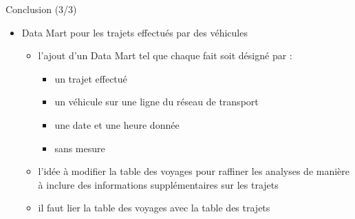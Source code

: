 \documentclass[usenames,dvipsnames]{beamer}
\begin{document}
\begin{frame}{Conclusion (3/3)}
\begin{itemize}
    \item Data Mart pour les trajets effectués par des véhicules
        \begin{itemize}
        \item 	l’ajout d’un Data Mart tel que chaque fait soit désigné par :
                \begin{itemize}
                \item un trajet effectué 
                \item un véhicule sur une ligne du réseau de transport 
                \item une date et une heure donnée
                \item sans mesure
                \end{itemize}
        \item	l’idée à modifier la table des voyages pour raffiner les analyses de manière à inclure des informations supplémentaires sur les trajets
        \item 	il faut lier la table des voyages avec la table des trajets 
        \end{itemize}
\end{itemize}
\end{frame}
\end{document}
